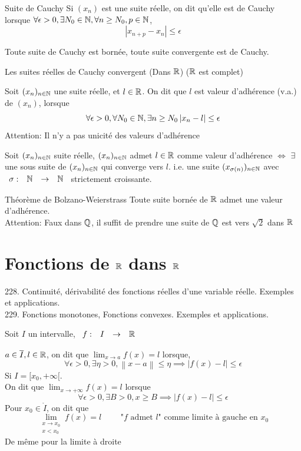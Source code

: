 \documentclass[]{report}
\begin{document}
\begin{df}{Suite de Cauchy}{}
    Si $(x_n)$ est une suite réelle, on dit qu'elle est de Cauchy lorsque $\forall \epsilon>0, \exists N_0\in \mathbb{N}, \forall n\ge N_0, p\in \mathbb{N}$,
    \[\left|x_{n+p}-x_n \right|\le \epsilon\]
\end{df}

\begin{prop}{}{}
    Toute suite de Cauchy est bornée, toute suite convergente est de Cauchy.
\end{prop}

\begin{prop}{}{}
    Les suites réelles de Cauchy convergent (Dans $\mathbb{R}$) ($\mathbb{R}$ est complet)
\end{prop}

\begin{df}{}{}
    Soit $(x_n)_{n\in\mathbb{N}}$ une suite réelle, et $l\in \mathbb{R}$. On dit que $l$ est valeur d'adhérence (v.a.) de $(x_n)$, lorsque
    \[\forall \epsilon > 0, \forall N_0\in \mathbb{N},\exists n\ge N_0 \left|x_n-l\right|\le \epsilon\]
    Attention: Il n'y a pas unicité des valeurs d'adhérence
\end{df}

\begin{prop}{}{}
    Soit $(x_n)_{n\in\mathbb{N}}$ suite réelle, $(x_n)_{n\in\mathbb{N}}$ admet $l\in \mathbb{R}$ comme valeur d'adhérence $ \iff$ $\exists$ une sous suite de $(x_n)_{n\in\mathbb{N}}$ qui converge vers $l$. i.e. une suite $(x_{\sigma(n)})_{n\in\mathbb{N}}$ avec $\begin{array}{ccccc} \sigma : & \mathbb{N} & \to & \mathbb{N} \end{array}$ strictement croissante.
\end{prop}

\begin{tm}{Théorème de Bolzano-Weierstrass}{}
    Toute suite bornée de $\mathbb{R}$ admet une valeur d'adhérence.\\
    Attention: Faux dans $\mathbb{Q}$, il suffit de prendre une suite de $\mathbb{Q}$ est vers $\sqrt{2}$ dans $\mathbb{R}$
\end{tm}

\chapter{Fonctions de $\mathbb{R}$ dans $\mathbb{R}$}

228. Continuité, dérivabilité des fonctions réelles d'une variable  réelle. Exemples et applications.\\
229. Fonctions monotones, Fonctions convexes. Exemples et applications.

Soit $I$ un intervalle, $\begin{array}{ccccc} f : & I & \to & \mathbb{R} \end{array}$

\begin{df}{}{}
    $a\in \overline{I},l\in \mathbb{R}$, on dit que $\lim_{x\to a} f(x)=l$ lorsque,
    \[\forall \epsilon>0, \exists \eta >0, \left\|x-a\right\|\le \eta \implies \left| f(x)-l\right|\le \epsilon\]
    Si $I=[x_0,+\infty[$.\\
    On dit que $\lim_{x\to +\infty} f(x)= l$ lorsque
    \[\forall \epsilon>0,\exists B>0, x\ge B\implies \left|f(x)-l\right|\le \epsilon\]
    Pour $x_0\in \mathring{I}$, on dit que
    \[\lim_{\substack{x\to x_0 \\ x<x_0}} f(x)= l\qquad \text{ "$f$ admet $l$" comme limite à gauche en $x_0$}\]
    De même pour la limite à droite
\end{df}
\end{document}
